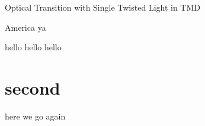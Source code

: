 \label{ch:appendices}

\begin{Appx}{Optical Transition with Single Twisted Light in TMD} %

America ya

hello hello hello 

\section{second}


here we go again

\end{Appx}